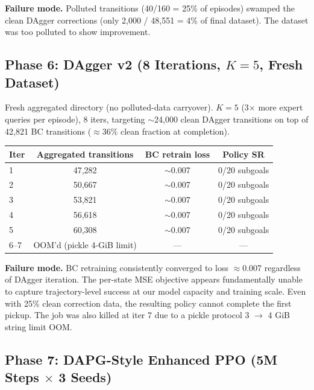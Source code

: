 \documentclass[11pt,letterpaper]{article}
\begin{document}
\begin{finding}
\textbf{Failure mode.} Polluted transitions (40/160 = 25\% of episodes) swamped the
clean DAgger corrections (only 2,000 / 48,551 = 4\% of final dataset). The dataset
was too polluted to show improvement.
\end{finding}

\subsection{Phase 6: DAgger v2 (8 Iterations, $K=5$, Fresh Dataset)}

Fresh aggregated directory (no polluted-data carryover). $K=5$ (3$\times$ more
expert queries per episode), 8 iters, targeting $\sim$24,000 clean DAgger
transitions on top of 42,821 BC transitions ($\approx$36\% clean fraction at
completion).

\begin{table}[H]
\centering
\begin{tabular}{lccc}
\toprule
\textbf{Iter} & \textbf{Aggregated transitions} & \textbf{BC retrain loss} & \textbf{Policy SR} \\
\midrule
1 & 47,282 & $\sim$0.007 & 0/20 subgoals \\
2 & 50,667 & $\sim$0.007 & 0/20 subgoals \\
3 & 53,821 & $\sim$0.007 & 0/20 subgoals \\
4 & 56,618 & $\sim$0.007 & 0/20 subgoals \\
5 & 60,308 & $\sim$0.007 & 0/20 subgoals \\
6–7 & OOM'd (pickle 4-GiB limit) & — & — \\
\bottomrule
\end{tabular}
\end{table}

\begin{finding}
\textbf{Failure mode.} BC retraining consistently converged to loss $\approx$0.007
regardless of DAgger iteration. The per-state MSE objective appears fundamentally
unable to capture trajectory-level success at our model capacity and training
scale. Even with 25\% clean correction data, the resulting policy cannot complete
the first pickup. The job was also killed at iter 7 due to a pickle protocol 3
$\to$ 4 GiB string limit OOM.
\end{finding}

\subsection{Phase 7: DAPG-Style Enhanced PPO (5M Steps $\times$ 3 Seeds)}
\end{document}

